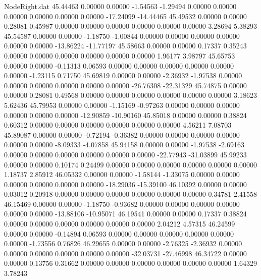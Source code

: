 \begin{filecontents}{NodeRight.dat}
  45.44463    0.00000    0.00000    -1.54563   -1.29494    0.00000    0.00000    0.00000    0.00000    0.00000    0.00000  -17.24099  -14.44465
  45.49532    0.00000    0.00000     0.28081    0.45987    0.00000    0.00000    0.00000    0.00000    0.00000    0.00000    3.28694    5.38293
  45.54587    0.00000    0.00000    -1.18750   -1.00844    0.00000    0.00000    0.00000    0.00000    0.00000    0.00000  -13.86224  -11.77197
  45.58663    0.00000    0.00000     0.17337    0.35243    0.00000    0.00000    0.00000    0.00000    0.00000    0.00000    1.96177    3.98797
  45.65753    0.00000    0.00000    -0.11313    0.06593    0.00000    0.00000    0.00000    0.00000    0.00000    0.00000   -1.23115    0.71750
  45.69819    0.00000    0.00000    -2.36932   -1.97538    0.00000    0.00000    0.00000    0.00000    0.00000    0.00000  -26.76308  -22.31329
  45.74875    0.00000    0.00000     0.28081    0.49568    0.00000    0.00000    0.00000    0.00000    0.00000    0.00000    3.18623    5.62436
  45.79953    0.00000    0.00000    -1.15169   -0.97263    0.00000    0.00000    0.00000    0.00000    0.00000    0.00000  -12.90859  -10.90160
  45.85018    0.00000    0.00000     0.38824    0.60312    0.00000    0.00000    0.00000    0.00000    0.00000    0.00000    4.56211    7.08703
  45.89087    0.00000    0.00000    -0.72194   -0.36382    0.00000    0.00000    0.00000    0.00000    0.00000    0.00000   -8.09333   -4.07858
  45.94158    0.00000    0.00000    -1.97538   -2.69163    0.00000    0.00000    0.00000    0.00000    0.00000    0.00000  -22.77943  -31.03899
  45.99233    0.00000    0.00000     0.10174    0.24499    0.00000    0.00000    0.00000    0.00000    0.00000    0.00000    1.18737    2.85912
  46.05332    0.00000    0.00000    -1.58144   -1.33075    0.00000    0.00000    0.00000    0.00000    0.00000    0.00000  -18.29036  -15.39100
  46.10392    0.00000    0.00000     0.03012    0.20918    0.00000    0.00000    0.00000    0.00000    0.00000    0.00000    0.34781    2.41558
  46.15469    0.00000    0.00000    -1.18750   -0.93682    0.00000    0.00000    0.00000    0.00000    0.00000    0.00000  -13.88106  -10.95071
  46.19541    0.00000    0.00000     0.17337    0.38824    0.00000    0.00000    0.00000    0.00000    0.00000    0.00000    2.04212    4.57315
  46.24599    0.00000    0.00000    -0.14894    0.06593    0.00000    0.00000    0.00000    0.00000    0.00000    0.00000   -1.73556    0.76826
  46.29655    0.00000    0.00000    -2.76325   -2.36932    0.00000    0.00000    0.00000    0.00000    0.00000    0.00000  -32.03731  -27.46998
  46.34722    0.00000    0.00000     0.13756    0.31662    0.00000    0.00000    0.00000    0.00000    0.00000    0.00000    1.64329    3.78243

\end{filecontents}
